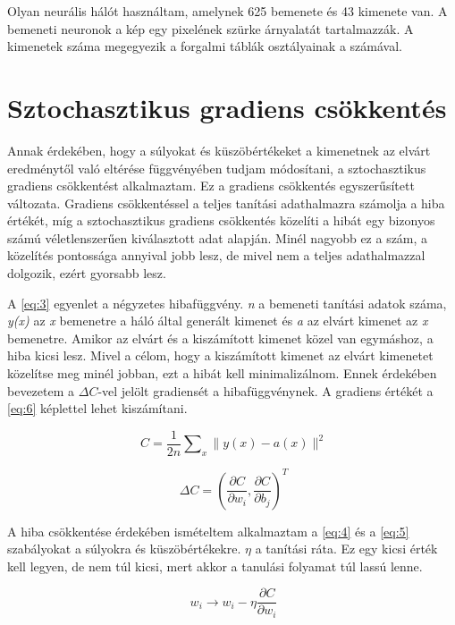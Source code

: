 Olyan neurális hálót használtam, amelynek 625 bemenete és 43 kimenete van. A bemeneti neuronok a kép egy pixelének szürke árnyalatát tartalmazzák. A kimenetek száma megegyezik a forgalmi táblák osztályainak a számával. 

\section{Sztochasztikus gradiens csökkentés}\label{sec:INTRO:graddesc}

Annak érdekében, hogy a súlyokat és küszöbértékeket a kimenetnek az elvárt eredménytől való eltérése függvényében tudjam módosítani, a sztochasztikus gradiens csökkentést alkalmaztam. Ez a gradiens csökkentés egyszerűsített változata. Gradiens csökkentéssel a teljes tanítási adathalmazra számolja a hiba értékét, míg a sztochasztikus gradiens csökkentés közelíti a hibát egy bizonyos számú véletlenszerűen kiválasztott adat alapján. Minél nagyobb ez a szám, a közelítés pontossága annyival jobb lesz, de mivel nem a teljes adathalmazzal dolgozik, ezért gyorsabb lesz.

A \ref{eq:3} egyenlet a négyzetes hibafüggvény. \textit{n} a bemeneti tanítási adatok száma, \textit{y(x)} az \textit{x} bemenetre a háló által generált kimenet és \textit{a} az elvárt kimenet az \textit{x} bemenetre. Amikor az elvárt és a kiszámított kimenet közel van egymáshoz, a hiba kicsi lesz. Mivel a célom, hogy a kiszámított kimenet az elvárt kimenetet közelítse meg minél jobban, ezt a hibát kell minimalizálnom. Ennek érdekében bevezetem a  $\Delta C$-vel jelölt gradiensét a hibafüggvénynek. A gradiens értékét a \ref{eq:6} képlettel lehet kiszámítani.

\begin{equation} \label{eq:3}
\ C = \frac{1}{2n}\sum\nolimits_{x} \|y(x)-a(x)\|^2
\end{equation}

\begin{equation} \label{eq:6}
\ \Delta C = (\frac{\partial C}{\partial w_{i}},\frac{\partial C}{\partial b_{j}})^T
\end{equation}

A hiba csökkentése érdekében ismételtem alkalmaztam a \ref{eq:4} és a \ref{eq:5} szabályokat a súlyokra és küszöbértékekre. $\eta$ a tanítási ráta. Ez egy kicsi érték kell legyen, de nem túl kicsi, mert akkor a tanulási folyamat túl lassú lenne.

\begin{equation} \label{eq:4}
\ w_{i} \rightarrow w_{i} - \eta\frac{\partial C}{\partial w_{i}} 
\end{equation}

